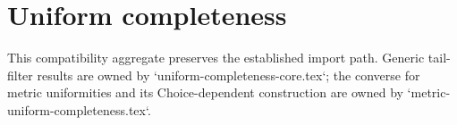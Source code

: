 \section{Uniform completeness}




This compatibility aggregate preserves the established import path.  Generic
tail-filter results are owned by `uniform-completeness-core.tex`; the converse
for metric uniformities and its Choice-dependent construction are owned by
`metric-uniform-completeness.tex`.
